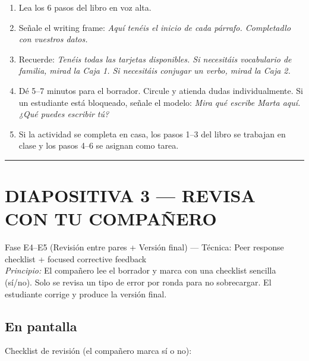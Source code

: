 \documentclass[a4paper,11pt]{article}
\begin{document}
\begin{enumerate}[leftmargin=1.5cm, itemsep=4pt]
\item Lea los 6 pasos del libro en voz alta.
\item Señale el writing frame: \textit{Aquí tenéis el inicio de cada párrafo. Completadlo con vuestros datos.}
\item Recuerde: \textit{Tenéis todas las tarjetas disponibles. Si necesitáis vocabulario de familia, mirad la Caja 1. Si necesitáis conjugar un verbo, mirad la Caja 2.}
\item Dé 5--7 minutos para el borrador. Circule y atienda dudas individualmente. Si un estudiante está bloqueado, señale el modelo: \textit{Mira qué escribe Marta aquí. ¿Qué puedes escribir tú?}
\item Si la actividad se completa en casa, los pasos 1--3 del libro se trabajan en clase y los pasos 4--6 se asignan como tarea.
\end{enumerate}

\newpage


\noindent\textcolor{violeta}{\rule{\linewidth}{2.5pt}}

\section*{DIAPOSITIVA 3 — REVISA CON TU COMPAÑERO}

{\small Fase E4--E5 (Revisión entre pares + Versión final) — Técnica: Peer response checklist + focused corrective feedback}\\
{\small\textit{Principio:} El compañero lee el borrador y marca con una checklist sencilla (sí/no). Solo se revisa un tipo de error por ronda para no sobrecargar. El estudiante corrige y produce la versión final.}

\vspace{0.5cm}

\subsection*{En pantalla}

Checklist de revisión (el compañero marca sí o no):
\end{document}
